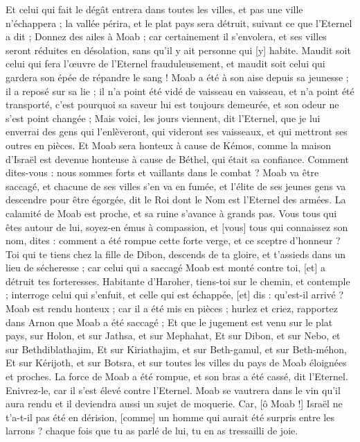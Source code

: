 \begin{multicols}{2}
Et celui qui fait le dégât entrera dans toutes les villes, et pas une ville n'échappera ; la vallée périra, et le plat pays sera détruit, suivant ce que l'Eternel a dit ;
Donnez des ailes à Moab ; car certainement il s'envolera, et ses villes seront réduites en désolation, sans qu'il y ait personne qui [y] habite.
Maudit soit celui qui fera l'œuvre de l'Eternel frauduleusement, et maudit soit celui qui gardera son épée de répandre le sang !
Moab a été à son aise depuis sa jeunesse ; il a reposé sur sa lie ; il n'a point été vidé de vaisseau en vaisseau, et n'a point été transporté, c'est pourquoi sa saveur lui est toujours demeurée, et son odeur ne s'est point changée ;
Mais voici, les jours viennent, dit l'Eternel, que je lui enverrai des gens qui l'enlèveront, qui videront ses vaisseaux, et qui mettront ses outres en pièces.
Et Moab sera honteux à cause de Kémos, comme la maison d'Israël est devenue honteuse à cause de Béthel, qui était sa confiance.
Comment dites-vous : nous sommes forts et vaillants dans le combat ?
Moab va être saccagé, et chacune de ses villes s'en va en fumée, et l'élite de ses jeunes gens va descendre pour être égorgée, dit le Roi dont le Nom est l'Eternel des armées.
La calamité de Moab est proche, et sa ruine s'avance à grands pas.
Vous tous qui êtes autour de lui, soyez-en émus à compassion, et [vous] tous qui connaissez son nom, dites : comment a été rompue cette forte verge, et ce sceptre d'honneur ?
Toi qui te tiens chez la fille de Dibon, descends de ta gloire, et t'assieds dans un lieu de sécheresse ; car celui qui a saccagé Moab est monté contre toi, [et] a détruit tes forteresses.
Habitante d'Haroher, tiens-toi sur le chemin, et contemple ; interroge celui qui s'enfuit, et celle qui est échappée, [et] dis : qu'est-il arrivé ?
Moab est rendu honteux ; car il a été mis en pièces ; hurlez et criez, rapportez dans Arnon que Moab a été saccagé ;
Et que le jugement est venu sur le plat pays, sur Holon, et sur Jathsa, et sur Mephahat,
Et sur Dibon, et sur Nebo, et sur Bethdiblathajim,
Et sur Kiriathajim, et sur Beth-gamul, et sur Beth-méhon,
Et sur Kérijoth, et sur Botsra, et sur toutes les villes du pays de Moab éloignées et proches.
La force de Moab a été rompue, et son bras a été cassé, dit l'Eternel.
Enivrez-le, car il s'est élevé contre l'Eternel. Moab se vautrera dans le vin qu'il aura rendu et il deviendra aussi un sujet de moquerie.
Car, [ô Moab !] Israël ne t'a-t-il pas été en dérision, [comme] un homme qui aurait été surpris entre les larrons ? chaque fois que tu as parlé de lui, tu en as tressailli de joie.

\end{multicols}
